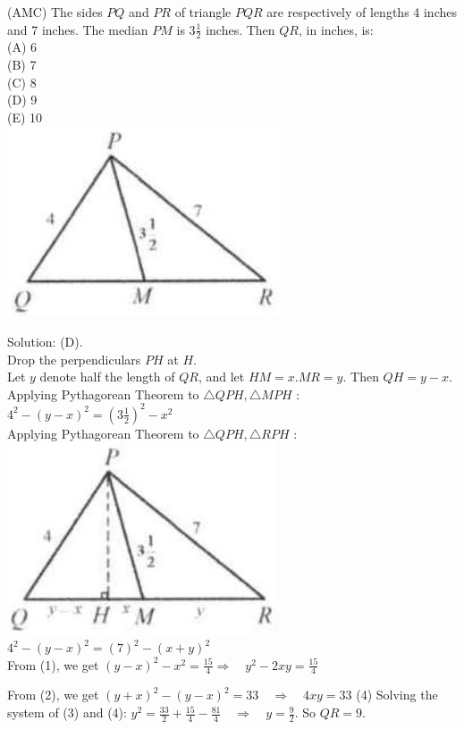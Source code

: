 \documentclass{article}
\begin{document}
(AMC) The sides \(P Q\) and \(P R\) of triangle \(P Q R\) are respectively of lengths 4 inches and 7 inches. The median \(P M\) is \(3 \frac{1}{2}\) inches. Then \(Q R\), in inches, is:\\
(A) 6\\
(B) 7\\
(C) 8\\
(D) 9\\
(E) 10\\
\centering
\includegraphics[width=\textwidth]{images/082.jpg}

Solution: (D).\\
Drop the perpendiculars \(P H\) at \(H\).\\
Let \(y\) denote half the length of \(Q R\), and let \(H M=x . M R=y\). Then \(Q H=y-x\).\\
Applying Pythagorean Theorem to \(\triangle Q P H, \triangle M P H\) :\\
\(4^{2}-(y-x)^{2}=\left(3 \frac{1}{2}\right)^{2}-x^{2}\)\\
Applying Pythagorean Theorem to \(\triangle Q P H, \triangle R P H\) :\\
\centering
\includegraphics[width=\textwidth]{images/082(1).jpg}\\
\(4^{2}-(y-x)^{2}=(7)^{2}-(x+y)^{2}\)\\
From (1), we get \((y-x)^{2}-x^{2}=\frac{15}{4} \Rightarrow \quad y^{2}-2 x y=\frac{15}{4}\)


From (2), we get \((y+x)^{2}-(y-x)^{2}=33 \quad \Rightarrow \quad 4 x y=33\) (4) Solving the system of (3) and (4): \(y^{2}=\frac{33}{2}+\frac{15}{4}-\frac{81}{4} \quad \Rightarrow \quad y=\frac{9}{2}\). So \(Q R=9\).
\end{document}
